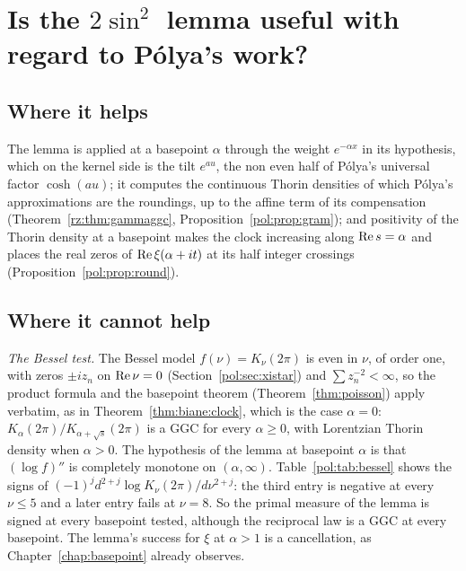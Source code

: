 \section{Is the $2\sin^2$ lemma useful with regard to P\'olya's work?}\label{pol:sec:lemma}

\subsection{Where it helps}

The lemma is applied at a basepoint $\alpha$ through the weight $e^{-\alpha x}$ in its hypothesis, which on the kernel side is the tilt $e^{au}$, the non even half of P\'olya's universal factor $\cosh(au)$; it computes the continuous Thorin densities of which P\'olya's approximations are the roundings, up to the affine term of its compensation (Theorem~\ref{rz:thm:gammaggc}, Proposition~\ref{pol:prop:gram}); and positivity of the Thorin density at a basepoint makes the clock increasing along $\operatorname{Re} s=\alpha$ and places the real zeros of $\operatorname{Re}\xi(\alpha+it)$ at its half integer crossings (Proposition~\ref{pol:prop:round}).

\subsection{Where it cannot help}

\emph{The Bessel test.} The Bessel model $f(\nu)=K_\nu(2\pi)$ is even in $\nu$, of order one, with zeros $\pm iz_n$ on $\operatorname{Re}\nu=0$ (Section~\ref{pol:sec:xistar}) and $\sum z_n^{-2}<\infty$, so the product formula and the basepoint theorem (Theorem~\ref{thm:poisson}) apply verbatim, as in Theorem~\ref{thm:biane:clock}, which is the case $\alpha=0$: $K_\alpha(2\pi)/K_{\alpha+\sqrt s}(2\pi)$ is a GGC for every $\alpha\ge0$, with Lorentzian Thorin density when $\alpha>0$. The hypothesis of the lemma at basepoint $\alpha$ is that $(\log f)''$ is completely monotone on $(\alpha,\infty)$. Table~\ref{pol:tab:bessel} shows the signs of $(-1)^jd^{2+j}\log K_\nu(2\pi)/d\nu^{2+j}$: the third entry is negative at every $\nu\le5$ and a later entry fails at $\nu=8$. So the primal measure of the lemma is signed at every basepoint tested, although the reciprocal law is a GGC at every basepoint. The lemma's success for $\xi$ at $\alpha>1$ is a cancellation, as Chapter~\ref{chap:basepoint} already observes.

